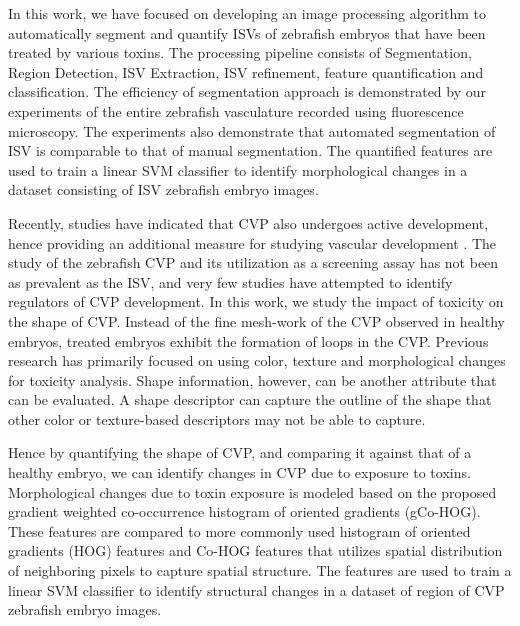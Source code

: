In this work, we have focused on developing an image processing algorithm to automatically segment and quantify ISVs of zebrafish embryos that have been treated by various toxins. The processing pipeline consists of Segmentation, Region Detection, ISV Extraction, ISV refinement, feature quantification and classification. The efficiency of segmentation approach is demonstrated by our experiments of the entire zebrafish vasculature recorded using fluorescence microscopy. The experiments also demonstrate that automated segmentation of ISV is comparable to that of manual segmentation. The quantified features are used to train a linear SVM classifier to identify morphological changes in a dataset consisting of ISV zebrafish embryo images.

Recently, studies have indicated that CVP also undergoes active development, hence providing an additional measure for studying vascular development \cite{Chen05}. The study of the zebrafish CVP and its utilization as a screening assay has not been as prevalent as the ISV, and very few studies have attempted to identify regulators of CVP development. In this work, we study the impact of toxicity on the shape of CVP. Instead of the fine mesh-work of the CVP observed in healthy embryos, treated embryos exhibit the formation of loops in the CVP. %
Previous research has primarily focused on using color, texture \cite{Tran07} and morphological changes \cite{Feng05} for toxicity analysis. Shape information, however, can be another attribute that can be evaluated. A shape descriptor can capture the outline of the shape that other color or texture-based descriptors may not be able to capture.

Hence by quantifying the shape of CVP, and comparing it against that of a healthy embryo, we can identify changes in CVP due to exposure to toxins. Morphological changes due to toxin exposure is modeled based on the proposed gradient weighted co-occurrence histogram of oriented gradients (gCo-HOG). These features are compared to more commonly used histogram of oriented gradients (HOG) features and Co-HOG features that utilizes spatial distribution of neighboring pixels to capture spatial structure. The features are used to train a linear SVM classifier to identify structural changes in a dataset of region of CVP zebrafish embryo images.

